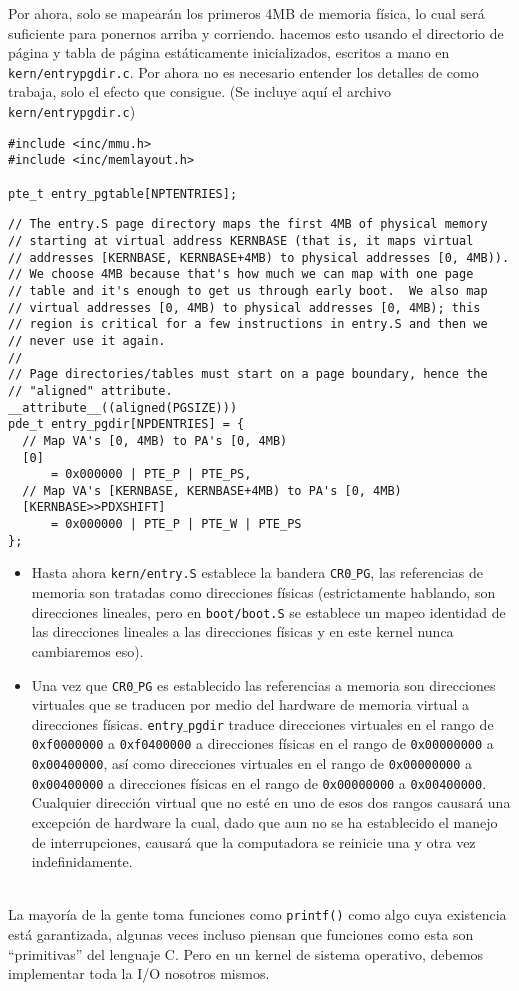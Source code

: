 \documentclass{article}
\begin{document}
Por ahora, solo se mapear\'an los primeros 4MB de memoria f\'isica, lo cual ser\'a 
suf\/iciente para ponernos arriba y corriendo. hacemos esto usando el directorio de 
p\'agina y tabla de p\'agina est\'aticamente inicializados, escritos a mano en 
{\tt kern/entrypgdir.c}. 
Por ahora no es necesario entender los detalles de como trabaja, solo el efecto que 
consigue. (Se incluye aqu\'i el archivo {\tt kern/entrypgdir.c})
\begin{verbatim}
#include <inc/mmu.h>
#include <inc/memlayout.h>

pte_t entry_pgtable[NPTENTRIES];
\end{verbatim}
\eject
\begin{verbatim}
// The entry.S page directory maps the first 4MB of physical memory
// starting at virtual address KERNBASE (that is, it maps virtual
// addresses [KERNBASE, KERNBASE+4MB) to physical addresses [0, 4MB)).
// We choose 4MB because that's how much we can map with one page
// table and it's enough to get us through early boot.  We also map
// virtual addresses [0, 4MB) to physical addresses [0, 4MB); this
// region is critical for a few instructions in entry.S and then we
// never use it again.
//
// Page directories/tables must start on a page boundary, hence the
// "aligned" attribute.
__attribute__((aligned(PGSIZE)))
pde_t entry_pgdir[NPDENTRIES] = {
  // Map VA's [0, 4MB) to PA's [0, 4MB)
  [0]
      = 0x000000 | PTE_P | PTE_PS,
  // Map VA's [KERNBASE, KERNBASE+4MB) to PA's [0, 4MB)
  [KERNBASE>>PDXSHIFT]
      = 0x000000 | PTE_P | PTE_W | PTE_PS
};
\end{verbatim}
\begin{itemize}
\item Hasta ahora {\tt kern/entry.S} establece la bandera {\tt CR0$\_$PG}, 
las referencias de memoria son tratadas como direcciones f\'isicas 
(estrictamente hablando, son direcciones lineales, pero en {\tt boot/boot.S} 
se establece un mapeo identidad de las direcciones lineales a las direcciones 
f\'isicas y en este kernel nunca cambiaremos eso).
\item Una vez que {\tt CR0$\_$PG} es establecido las referencias a memoria 
son direcciones virtuales que se traducen por medio del hardware de memoria 
virtual a direcciones f\'isicas. {\tt entry$\_$pgdir} traduce direcciones 
virtuales en el rango de {\tt 0xf0000000} a {\tt 0xf0400000} a direcciones 
f\'isicas en el rango de {\tt 0x00000000} a {\tt 0x00400000}, as\'i como 
direcciones virtuales en el rango de {\tt 0x00000000} a {\tt 0x00400000} a 
direcciones f\'isicas en el rango de {\tt 0x00000000} a {\tt 0x00400000}. 
Cualquier direcci\'on virtual que no est\'e en uno de esos dos rangos 
causar\'a una excepci\'on de hardware la cual, dado que aun no se ha 
establecido el manejo de interrupciones, causar\'a que la computadora se 
reinicie una y otra vez indefinidamente.
\end{itemize}
\\
La mayor\'ia de la gente toma funciones como {\tt printf()} como algo cuya 
existencia est\'a garantizada, algunas veces incluso piensan que funciones 
como esta son ``primitivas'' del lenguaje C. Pero en un kernel de sistema 
operativo, debemos implementar toda la I/O nosotros mismos.
\end{document}
